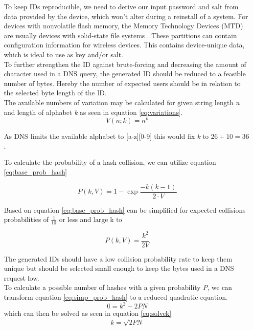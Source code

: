        To keep IDs reproducible, we need to derive our input password and salt from data provided by the device, which won't alter during a reinstall of a system. For devices with nonvolatile flash memory, the Memory Technology Devices (MTD) are usually devices with solid-state file systems \cite{giometti_mtd_2017} \cite{woodhouse_memory_nodate}. These partitions can contain configuration information for wireless devices. This contains device-unique data, which is ideal to use as key and/or salt.\\
        
        To further strengthen the ID against brute-forcing and decreasing the amount of character used in a DNS query, the generated ID should be reduced to a feasible number of bytes. Hereby the number of expected users should be in relation to the selected byte length of the ID.\\
        The available numbers of variation may be calculated for given string length \textit{n} and length of alphabet \textit{k} as seen in equation \ref{eq:variations}.
        \begin{equation}
            \label{eq:variations}
            V(n;k) = n^{k}
        \end{equation}

        As DNS limits the available alphabet to [a-z][0-9] this would fix \textit{k} to $26 + 10 = 36$.
        
        To calculate the probability of a hash collision, we can utilize equation \ref{eq:base_prob_hash}
        
        \begin{equation}
             \label{eq:base_prob_hash}
             P(k,V) = 1 - \exp{\frac{-k(k-1)}{2 \cdot V}}
        \end{equation}
     
        Based on  \cite{preshing_hash_2011} equation \ref{eq:base_prob_hash} can be simplified for expected collisions probabilities of $\frac{1}{10}$ or less and large k to
     
        \begin{equation}
            \label{eq:simp_prob_hash}
            P(k,V) = \frac{k^2}{2V} 
        \end{equation}
        
        The generated IDs should have a low collision probability rate to keep them unique but should be selected small enough to keep the bytes used in a DNS request low. \\
        To calculate a possible number of hashes with a given probability \textit{P}, we can transform equation \ref{eq:simp_prob_hash} to a reduced quadratic equation.
        \begin{equation*}
            0 = k^2 - 2PN
        \end{equation*}
        which can then be solved as seen in equation \ref{eq:solvek}
        \begin{equation}
            \label{eq:solvek}
            k = \sqrt{2PN}
        \end{equation}
        
